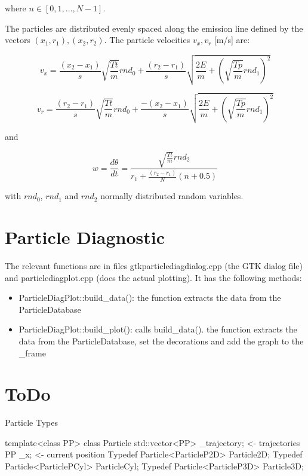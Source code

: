 \documentclass[12pt,a4paper]{article}
\begin{document}
where $n\in[0,1,...,N-1]$. 

The particles are distributed evenly spaced along the emission line defined by the vectors $(x_{1},r_{1}), (x_{2},r_{2})$. The particle velocities $v_{x},v_{r}$ [m/s] are:

\begin{equation}
	v_{x}=\frac{(x_{2}-x_{1})}{s}\sqrt{\frac{Tt}{m}}rnd_{0}+\frac{(r_{2}-r_{1})}{s}\sqrt{\frac{2E}{m}+(\sqrt{\frac{Tp}{m}}rnd_{1})^2}
\end{equation}

\begin{equation}
	v_{r}=\frac{(r_{2}-r_{1})}{s}\sqrt{\frac{Tt}{m}}rnd_{0}+\frac{-(x_{2}-x_{1})}{s}\sqrt{\frac{2E}{m}+(\sqrt{\frac{Tp}{m}}rnd_{1})^2} 
\end{equation}

and

\begin{equation}
	w=\frac{d\theta}{dt}=\frac{\sqrt{\frac{Tt}{m}}rnd_{2}}{r_{1} + \frac{(r_{2}-r_{1})}{N}(n+0.5)}
\end{equation}

with $rnd_{0}$, $rnd_{1}$ and $rnd_{2}$ normally distributed random variables.

\section{Particle Diagnostic}

The relevant functions are in files gtkparticlediagdialog.cpp (the GTK dialog file) and particlediagplot.cpp (does the actual plotting). It has the following methods:

\begin{itemize}
	\item ParticleDiagPlot::build_data(): the function extracts the data from the ParticleDatabase
	\item ParticleDiagPlot::build_plot(): calls build_data(). the function extracts the data from the ParticleDatabase, set the decorations and add the graph to the _frame
\end{itemize}


\section{ToDo}

Particle Types

template<class PP> class Particle {
	std::vector<PP> 	_trajectory; <- trajectories
       PP				_x; <- current position
}
Typedef Particle<ParticleP2D> Particle2D;
Typedef Particle<ParticlePCyl> ParticleCyl;
Typedef Particle<ParticleP3D> Particle3D;
\end{document}
